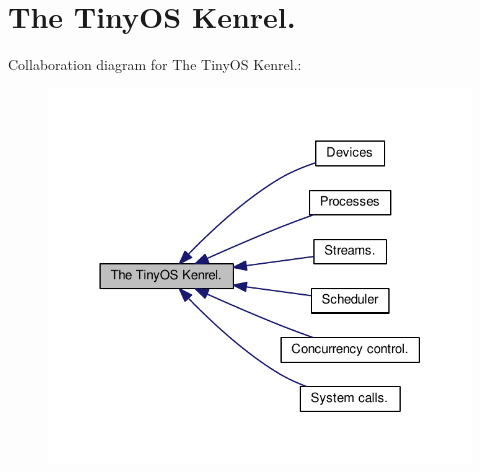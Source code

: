 \hypertarget{group__kernel}{\section{The Tiny\-O\-S Kenrel.}
\label{group__kernel}
}
Collaboration diagram for The Tiny\-O\-S Kenrel.\-:
\nopagebreak
\begin{figure}[H]
\begin{center}
\leavevmode
\includegraphics[width=328pt]{group__kernel}
\end{center}
\end{figure}

